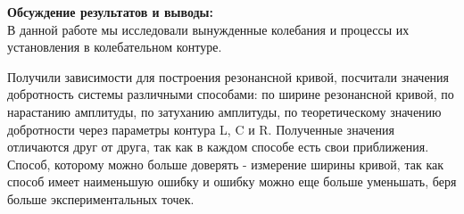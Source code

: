 \documentclass[a4paper, 12pt]{article}%
\begin{document}
	
	\textbf{Обсуждение результатов и выводы: }\\
	
	В данной работе мы исследовали вынужденные колебания и процессы их установления в колебательном контуре.
	
	Получили зависимости для построения резонансной кривой, посчитали значения добротность системы различными способами: по ширине резонансной кривой, по нарастанию амплитуды, по затуханию амплитуды, по теоретическому значению добротности через параметры
	контура L, C и R. Полученные значения отличаются друг от друга, так как в каждом способе есть свои приближения. Способ, которому можно больше доверять - измерение ширины кривой, так как способ имеет наименьшую ошибку и ошибку можно еще больше уменьшать, беря больше экспериментальных точек.
	
	
	
	
	
	
	
	
\end{document}
